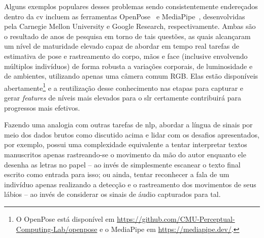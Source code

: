 Alguns exemplos populares desses problemas sendo consistentemente endereçados dentro da \acrshort{cv} incluem as ferramentas OpenPose~\cite{wei-2016-conv-machines-openpose,cao-2017-openpose,simon-2017-openpose-hand-face} e MediaPipe~\cite{lugaresi-2019-mediapipe,bazarevsky-2019-mediapipe-blazeface,vakunov-2020-mediapipe-hands,bazarevsky-2020-mediapipe-blazepose}, desenvolvidas pela Carnegie Mellon University e Google Research, respectivamente.
Ambas são o resultado de anos de pesquisa em torno de tais questões, as quais alcançaram um nível de maturidade elevado capaz de abordar em tempo real tarefas de estimativa de pose e rastreamento do corpo, mãos e face (inclusive envolvendo múltiplos indivíduos) de forma robusta a variações corporais, de luminosidade e de ambientes, utilizando apenas uma câmera comum RGB.
Elas estão disponíveis abertamente\footnote{
    O OpenPose está disponível em \url{https://github.com/CMU-Perceptual-Computing-Lab/openpose} e o MediaPipe em \url{https://mediapipe.dev/}.
} e a reutilização desse conhecimento nas etapas para capturar e gerar \textit{features} de níveis mais elevados para o \acrshort{slr} certamente contribuirá para progressos mais efetivos.


Fazendo uma analogia com outras tarefas de \acrshort{nlp}, abordar a língua de sinais por meio dos dados brutos como discutido acima e lidar com os desafios apresentados, por exemplo, possui uma complexidade equivalente a tentar interpretar textos manuscritos apenas rastreando-se o movimento da mão do autor enquanto ele desenha as letras no papel -- ao invés de simplesmente escanear o texto final escrito como entrada para isso; ou ainda, tentar reconhecer a fala de um indivíduo apenas realizando a detecção e o rastreamento dos movimentos de seus lábios -- ao invés de considerar os sinais de áudio capturados para tal.



